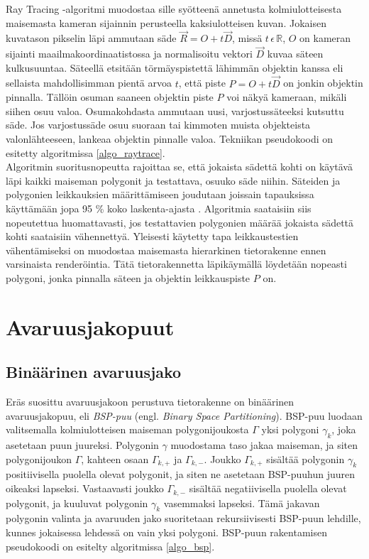 \documentclass[a4paper,12pt, titlepage]{article}
\newcommand{\R}{\mathbb{R}}
\begin{document}
Ray Tracing -algoritmi muodostaa sille syötteenä annetusta kolmiulotteisesta maisemasta kameran sijainnin perusteella kaksiulotteisen kuvan. Jokaisen kuvatason pikselin läpi ammutaan säde $\vec{R}=O+t\vec{D}$, missä $t\,\epsilon\,\R$, $O$ on kameran sijainti maailmakoordinaatistossa ja normalisoitu vektori $\vec{D}$ kuvaa säteen kulkusuuntaa. Säteellä etsitään törmäyspistettä lähimmän objektin kanssa eli sellaista mahdollisimman pientä arvoa $t$, että piste $P=O+t\vec{D}$ on jonkin objektin pinnalla. Tällöin osuman saaneen objektin piste $P$ voi näkyä kameraan, mikäli siihen osuu valoa. Osumakohdasta ammutaan uusi, varjostussäteeksi kutsuttu säde. Jos varjostussäde osuu suoraan tai kimmoten muista objekteista valonlähteeseen, lankeaa objektin pinnalle valoa. \citep[.]{janke} Tekniikan pseudokoodi on esitetty algoritmissa \ref{algo_raytrace}.\\




Algoritmin suoritusnopeutta rajoittaa se, että jokaista sädettä kohti on käytävä läpi kaikki maiseman polygonit ja testattava, osuuko säde niihin. Säteiden ja polygonien leikkauksien määrittämiseen joudutaan joissain tapauksissa käyttämään jopa 95 \% koko laskenta-ajasta \citep{whitted}. Algoritmia saataisiin siis nopeutettua huomattavasti, jos testattavien polygonien määrää jokaista sädettä kohti saataisiin vähennettyä. Yleisesti käytetty tapa leikkaustestien vähentämiseksi on muodostaa maisemasta hierarkinen tietorakenne ennen varsinaista renderöintia. Tätä tietorakennetta läpikäymällä löydetään nopeasti polygoni, jonka pinnalla säteen ja objektin leikkauspiste $P$ on. \citep[.]{rubin}


\newpage
\section{Avaruusjakopuut}
\subsection{Binäärinen avaruusjako}

Eräs suosittu avaruusjakoon perustuva tietorakenne on binäärinen avaruusjakopuu, eli \emph{BSP-puu} (engl. \emph{Binary Space Partitioning}). BSP-puu luodaan valitsemalla kolmiulotteisen maiseman  polygonijoukosta $\Gamma$ yksi polygoni $\gamma_k$, joka asetetaan puun juureksi. Polygonin $\gamma$ muodostama taso jakaa maiseman, ja siten polygonijoukon $\Gamma$, kahteen osaan $\Gamma_{k,+}$ ja $\Gamma_{k,-}$. Joukko $\Gamma_{k,+}$ sisältää polygonin $\gamma_k$ positiivisella puolella olevat polygonit, ja siten ne asetetaan BSP-puuhun juuren oikeaksi lapseksi. Vastaavasti joukko $\Gamma_{k,-}$ sisältää negatiivisella puolella olevat polygonit, ja kuuluvat polygonin $\gamma_k$ vasemmaksi lapseksi. Tämä jakavan polygonin valinta ja avaruuden jako suoritetaan rekursiivisesti BSP-puun lehdille, kunnes jokaisessa lehdessä on vain yksi polygoni. \citep[.]{samet} BSP-puun rakentamisen pseudokoodi on esitelty algoritmissa \ref{algo_bsp}.\\
\end{document}
